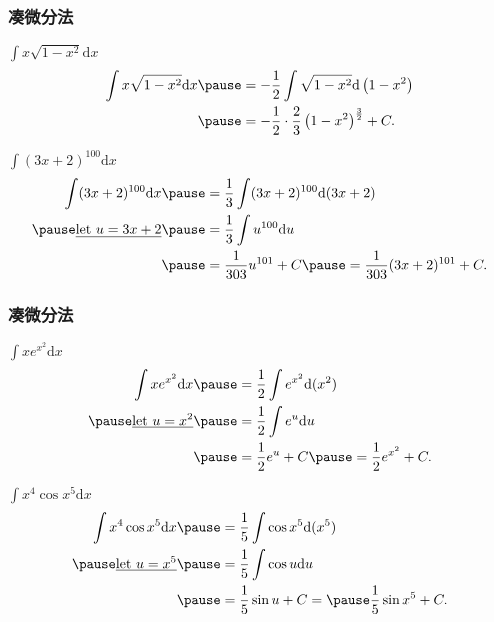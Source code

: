 \documentclass[
10pt,
aspectratio=43,
]{beamer}
\begin{document}
\begin{frame}
	\frametitle{凑微分法}
	\everymath{\displaystyle}
	\begin{exampleblock}{$\int x \sqrt{1-x^2} \mathrm{d} x$}
		$$
			\begin{aligned}
				\int x \sqrt{1-x^2} \mathrm{d} x & \pause= -\frac{1}{2} \int \sqrt{1-x^2} \mathrm{d}\left(1-x^2\right)       \\
				                                 & \pause= -\frac{1}{2} \cdot \frac{2}{3}\left(1-x^2\right)^{\frac{3}{2}}+C.
			\end{aligned}
		$$
	\end{exampleblock}
	\pause
	\begin{exampleblock}{$\int (3x+2)^{100} \mathrm{d}x$}
		$$
			\begin{aligned}
				\int (3x+2)^{100} \mathrm{d}x & \pause= \frac{1}{3} \int (3x+2)^{100} \mathrm{d}(3x+2)         \\
				\pause\underline{\text{let }u=3x+2} & \pause=  \frac{1}{3} \int u^{100} \mathrm{d}u                  \\
				                              & \pause= \frac{1}{303} u^{101}+C \pause = \frac{1}{303}(3x+2)^{101}+C.
			\end{aligned}
		$$
	\end{exampleblock}
\end{frame}

\begin{frame}
	\frametitle{凑微分法}
	\everymath{\displaystyle}
	{\small
		\begin{exampleblock}{$\int x e^{x^2} \mathrm{d}x$}
			$$
				\begin{aligned}
					\int x e^{x^2} \mathrm{d}x   & \pause= \frac{1}{2} \int e^{x^2} \mathrm{d}(x^2)   \\
					\pause\underline{\text{let }u=x^2} & \pause=  \frac{1}{2} \int e^u \mathrm{d}u          \\
					                             & \pause= \frac{1}{2} e^u+C \pause= \frac{1}{2} e^{x^2}+C.
				\end{aligned}
			$$
		\end{exampleblock}
		\pause
		\begin{exampleblock}{$\int x^4 \cos x^5 \mathrm{d}x$}
			$$
				\begin{aligned}
					\int x^4 \cos x^5 \mathrm{d}x &\pause = \frac{1}{5} \int \cos x^5 \mathrm{d}(x^5)      \\
					\pause\underline{\text{let }u=x^5}  &\pause =  \frac{1}{5} \int \cos u \mathrm{d}u           \\
					                              &\pause = \frac{1}{5} \sin u+C =\pause \frac{1}{5} \sin x^5+C.
				\end{aligned}
			$$
		\end{exampleblock}
	}
\end{frame}
\end{document}
